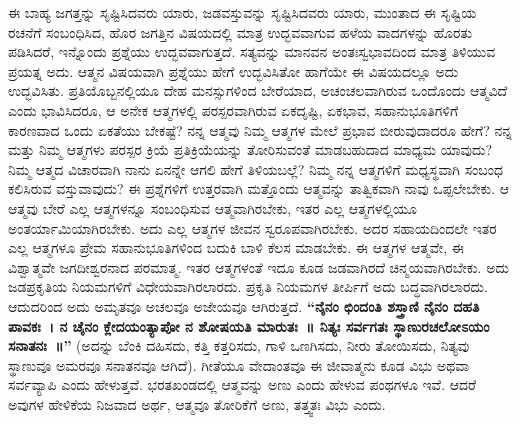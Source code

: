 ಈ ಬಾಹ್ಯ ಜಗತ್ತನ್ನು ಸೃಷ್ಟಿಸಿದವರು ಯಾರು, ಜಡವಸ್ತುವನ್ನು ಸೃಷ್ಟಿಸಿದವರು ಯಾರು, ಮುಂತಾದ ಈ ಸೃಷ್ಟಿಯ ರಚನೆಗೆ ಸಂಬಂಧಿಸಿದ, ಹೊರ ಜಗತ್ತಿನ ವಿಷಯದಲ್ಲಿ ಮಾತ್ರ ಉದ್ಭವವಾಗುವ ಹಳೆಯ ವಾದಗಳನ್ನು ಹೊರತು ಪಡಿಸಿದರೆ, ಇನ್ನೊಂದು ಪ್ರಶ್ನೆಯು ಉದ್ಭವವಾಗುತ್ತದೆ. ಸತ್ಯವನ್ನು ಮಾನವನ ಅಂತಃಸ್ವಭಾವದಿಂದ ಮಾತ್ರ ತಿಳಿಯುವ ಪ್ರಯತ್ನ ಅದು. ಆತ್ಮನ ವಿಷಯವಾಗಿ ಪ್ರಶ್ನೆಯು ಹೇಗೆ ಉದ್ಭವಿಸಿತೋ ಹಾಗೆಯೇ ಈ ವಿಷಯದಲ್ಲೂ ಅದು ಉದ್ಭವಿಸಿತು. ಪ್ರತಿಯೊಬ್ಬನಲ್ಲಿಯೂ ದೇಹ ಮನಸ್ಸುಗಳಿಂದ ಬೇರೆಯಾದ, ಅಚಂಚಲವಾಗಿರುವ ಒಂದೊಂದು ಆತ್ಮವಿದೆ ಎಂದು ಭಾವಿಸಿದರೂ, ಆ ಅನೇಕ ಆತ್ಮಗಳಲ್ಲಿ ಪರಸ್ಪರವಾಗಿರುವ ಏಕದೃಷ್ಟಿ, ಏಕಭಾವ, ಸಹಾನುಭೂತಿಗಳಿಗೆ ಕಾರಣವಾದ ಒಂದು ಏಕತೆಯು ಬೇಕಷ್ಟೆ? ನನ್ನ ಆತ್ಮವು ನಿಮ್ಮ ಆತ್ಮಗಳ ಮೇಲೆ ಪ್ರಭಾವ ಬೀರುವುದಾದರೂ ಹೇಗೆ? ನನ್ನ ಮತ್ತು ನಿಮ್ಮ ಆತ್ಮಗಳು ಪರಸ್ಪರ ಕ್ರಿಯೆ ಪ್ರತಿಕ್ರಿಯೆಯನ್ನು ತೋರಿಸುವಂತೆ ಮಾಡಬಹುದಾದ ಮಾಧ್ಯಮ ಯಾವುದು? ನಿಮ್ಮ ಆತ್ಮದ ವಿಚಾರವಾಗಿ ನಾನು ಏನನ್ನೇ ಆಗಲಿ ಹೇಗೆ ತಿಳಿಯಬಲ್ಲೆ? ನಿಮ್ಮ ನನ್ನ ಆತ್ಮಗಳಿಗೆ ಮಧ್ಯಸ್ಥವಾಗಿ ಸಂಬಂಧ ಕಲಿಸಿರುವ ವಸ್ತುವಾವುದು? ಈ ಪ್ರಶ್ನೆಗಳಿಗೆ ಉತ್ತರವಾಗಿ ಮತ್ತೊಂದು ಆತ್ಮವನ್ನು ತಾತ್ವಿಕವಾಗಿ ನಾವು ಒಪ್ಪಲೇಬೇಕು. ಆ ಆತ್ಮವು ಬೇರೆ ಎಲ್ಲ ಆತ್ಮಗಳನ್ನೂ ಸಂಬಂಧಿಸುವ ಆತ್ಮವಾಗಿರಬೇಕು, ಇತರ ಎಲ್ಲ ಆತ್ಮಗಳಲ್ಲಿಯೂ ಅಂತರ್ಯಾಮಿಯಾಗಿರಬೇಕು. ಅದು ಎಲ್ಲ ಆತ್ಮಗಳ ಜೀವನ ಸ್ವರೂಪವಾಗಿರಬೇಕು. ಅದರ ಸಹಾಯದಿಂದಲೇ ಇತರ ಎಲ್ಲ ಆತ್ಮಗಳೂ ಪ್ರೇಮ ಸಹಾನುಭೂತಿಗಳಿಂದ ಬದುಕಿ ಬಾಳಿ ಕೆಲಸ ಮಾಡಬೇಕು. ಈ ಆತ್ಮಗಳ ಆತ್ಮವೇ, ಈ ವಿಶ್ವಾತ್ಮವೇ ಜಗದೀಶ್ವರನಾದ ಪರಮಾತ್ಮ. ಇತರ ಆತ್ಮಗಳಂತೆ ಇದೂ ಕೂಡ ಜಡವಾಗಿರದೆ ಚಿನ್ಮಯವಾಗಿರಬೇಕು. ಅದು ಜಡಪ್ರಕೃತಿಯ ನಿಯಮಗಳಿಗೆ ವಿಧೇಯವಾಗಿರಲಾರದು. ಪ್ರಕೃತಿ ನಿಯಮಗಳ ತೀರ್ಪಿಗೆ ಅದು ಬದ್ಧವಾಗಿರಲಾರದು. ಆದುದರಿಂದ ಅದು ಅಮೃತವೂ ಅಚಲವೂ ಅಜೇಯವೂ ಆಗಿರುತ್ತದೆ. \textbf{“ನೈನಂ ಛಿಂದಂತಿ ಶಸ್ತ್ರಾಣಿ ನೈನಂ ದಹತಿ ಪಾವಕಃ~। ನ ಚೈನಂ ಕ್ಲೇದಯಂತ್ಯಾಪೋ ನ ಶೋಷಯತಿ ಮಾರುತಃ~॥ ನಿತ್ಯಃ ಸರ್ವಗತಃ ಸ್ಥಾಣುರಚಲೋಽಯಂ ಸನಾತನಃ~॥”} (ಅದನ್ನು ಬೆಂಕಿ ದಹಿಸದು, ಕತ್ತಿ ಕತ್ತರಿಸದು, ಗಾಳಿ ಒಣಗಿಸದು, ನೀರು ತೋಯಿಸದು, ನಿತ್ಯವು ಸ್ಥಾಣುವೂ ಅಮರವೂ ಸನಾತನವೂ ಆಗಿದೆ). ಗೀತೆಯೂ ವೇದಾಂತವೂ ಈ ಜೀವಾತ್ಮನು ಕೂಡ ವಿಭು ಅಥವಾ ಸರ್ವವ್ಯಾಪಿ ಎಂದು ಹೇಳುತ್ತವೆ. ಭರತಖಂಡದಲ್ಲಿ ಆತ್ಮವನ್ನು ಅಣು ಎಂದು ಹೇಳುವ ಪಂಥಗಳೂ ಇವೆ. ಆದರೆ ಅವುಗಳ ಹೇಳಿಕೆಯ ನಿಜವಾದ ಅರ್ಥ, ಆತ್ಮವೂ ತೋರಿಕೆಗೆ ಅಣು, ತತ್ತ್ವತಃ ವಿಭು ಎಂದು. 

